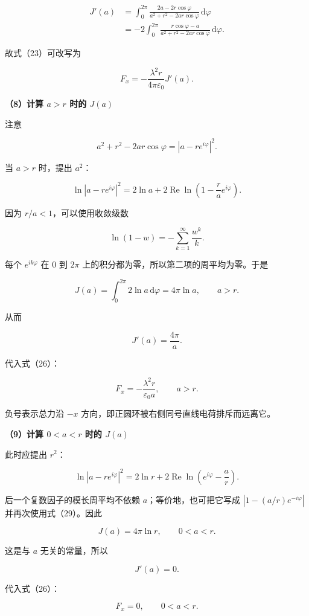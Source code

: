 \documentclass[12pt,a4paper,UTF8]{ctexart}
\begin{document}
\[
\begin{aligned}
J'(a)
&=\int_0^{2\pi}
\frac{2a-2r\cos\varphi}
{a^2+r^2-2ar\cos\varphi}
\,\mathrm d\varphi\\
&=-2\int_0^{2\pi}
\frac{r\cos\varphi-a}
{a^2+r^2-2ar\cos\varphi}
\,\mathrm d\varphi.
\end{aligned}
\tag{25}
\]

故式（23）可改写为

\[
\boxed{
F_x=-\frac{\lambda^2r}{4\pi\varepsilon_0}J'(a)
}.
\tag{26}
\]

\textbf{（8）计算 \(a>r\) 时的 \(J(a)\)}

注意

\[
a^2+r^2-2ar\cos\varphi
=|a-re^{i\varphi}|^2.
\tag{27}
\]

当 \(a>r\) 时，提出 \(a^2\)：

\[
\ln|a-re^{i\varphi}|^2
=2\ln a
+2\operatorname{Re}\ln\!\left(1-\frac rae^{i\varphi}\right).
\tag{28}
\]

因为 \(r/a<1\)，可以使用收敛级数

\[
\ln(1-w)=-\sum_{k=1}^{\infty}\frac{w^k}{k}.
\tag{29}
\]

每个 \(e^{ik\varphi}\) 在 \(0\) 到 \(2\pi\)
上的积分都为零，所以第二项的周平均为零。于是

\[
J(a)=\int_0^{2\pi}2\ln a\,\mathrm d\varphi
=4\pi\ln a,
\qquad a>r.
\tag{30}
\]

从而

\[
J'(a)=\frac{4\pi}{a}.
\tag{31}
\]

代入式（26）：

\[
\boxed{
F_x=-\frac{\lambda^2r}{\varepsilon_0a},
\qquad a>r
}.
\tag{32}
\]

负号表示总力沿 \(-x\) 方向，即正圆环被右侧同号直线电荷排斥而远离它。

\textbf{（9）计算 \(0<a<r\) 时的 \(J(a)\)}

此时应提出 \(r^2\)：

\[
\ln|a-re^{i\varphi}|^2
=2\ln r
+2\operatorname{Re}\ln\!\left(e^{i\varphi}-\frac ar\right).
\tag{33}
\]

后一个复数因子的模长周平均不依赖 \(a\)；等价地，也可把它写成
\(|1-(a/r)e^{-i\varphi}|\) 并再次使用式（29）。因此

\[
J(a)=4\pi\ln r,
\qquad 0<a<r.
\tag{34}
\]

这是与 \(a\) 无关的常量，所以

\[
J'(a)=0.
\tag{35}
\]

代入式（26）：

\[
\boxed{F_x=0,\qquad 0<a<r}.
\tag{36}
\]
\end{document}
